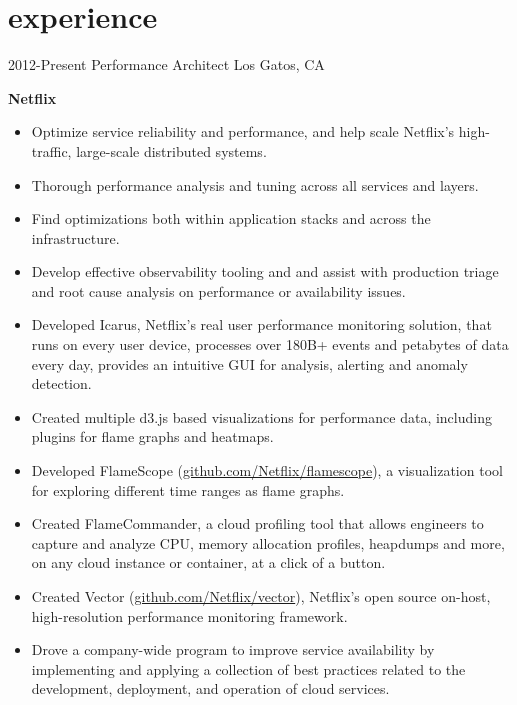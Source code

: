 \section{experience}

\begin{entrylist}
  \entry
    {2012-Present}
    {Performance Architect}
    {Los Gatos, CA}
    {
      \textbf{Netflix}
      \begin{itemize}
        \item Optimize service reliability and performance, and help scale Netflix's high-traffic, large-scale distributed systems.
        \item Thorough performance analysis and tuning across all services and layers.
        \item Find optimizations both within application stacks and across the infrastructure.
        \item Develop effective observability tooling and and assist with production triage and root cause analysis on performance or availability issues.  
      \end{itemize}
      \begin{itemize}
        \item Developed Icarus, Netflix's real user performance monitoring solution, that runs on every user device, processes over 180B+ events and petabytes of data every day, provides an intuitive GUI for analysis, alerting and anomaly detection.
        \item Created multiple d3.js based visualizations for performance data, including plugins for flame graphs and heatmaps.
        \item Developed FlameScope (\href{https://github.com/Netflix/flamescope}{github.com/Netflix/flamescope}), a visualization tool for exploring different time ranges as flame graphs.
        \item Created FlameCommander, a cloud profiling tool that allows engineers to capture and analyze CPU, memory allocation profiles, heapdumps and more, on any cloud instance or container, at a click of a button.
        \item Created Vector (\href{https://github.com/Netflix/vector}{github.com/Netflix/vector}), Netflix's open source on-host, high-resolution performance monitoring framework.
        \item Drove a company-wide program to improve service availability by implementing and applying a collection of best practices related to the development, deployment, and operation of cloud services.

\end{itemize}}
\end{entrylist}
